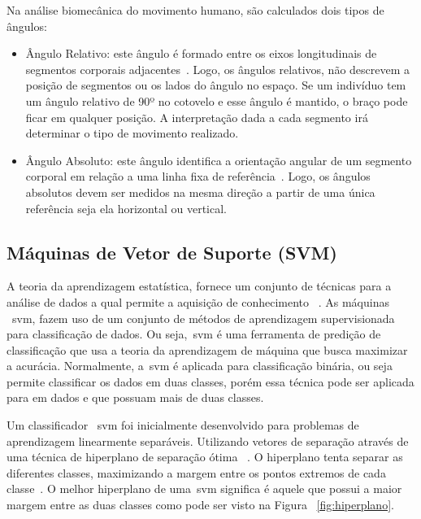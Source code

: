 Na análise biomecânica do movimento humano, são calculados dois tipos de ângulos:
	\begin{itemize}
		\item Ângulo Relativo: este ângulo é formado entre os eixos longitudinais de segmentos corporais adjacentes~\cite{hamill1999bases}. Logo, os ângulos relativos, não descrevem a posição de segmentos ou os lados do ângulo no espaço. Se um indivíduo tem um ângulo relativo de 90º no cotovelo e esse ângulo é mantido, o braço pode ficar em qualquer posição. A interpretação dada a cada segmento irá determinar o tipo de movimento realizado. 
		\item Ângulo Absoluto: este ângulo identifica a orientação angular de um segmento corporal em relação a uma linha fixa de referência~\cite{hamill1999bases}. Logo, os ângulos absolutos devem ser medidos na mesma direção a partir de uma única referência seja ela horizontal ou vertical.
	\end{itemize}



\subsection{Máquinas de Vetor de Suporte (SVM)}\label{sec:svm_linear}
A teoria da aprendizagem estatística, fornece um conjunto de técnicas para a análise de dados a qual permite a aquisição de conhecimento ~\cite{vapnik95}. As máquinas ~\ac{svm}, fazem uso de um conjunto de métodos de aprendizagem supervisionada para classificação de dados. Ou seja,~\ac{svm} é uma ferramenta de predição de classificação que usa a teoria da aprendizagem de máquina que busca maximizar a acurácia. Normalmente, a~\ac{svm} é aplicada para classificação binária, ou seja permite classificar os dados em duas classes, porém essa técnica pode ser aplicada para em dados e que possuam mais de duas classes.

Um classificador ~\ac{svm} foi inicialmente desenvolvido para problemas de aprendizagem linearmente separáveis. Utilizando vetores de separação através de uma técnica de hiperplano de separação ótima ~\cite{vapnik95}. O hiperplano tenta separar as diferentes classes, maximizando a margem entre os pontos extremos de cada classe~\cite{valt2010}. O melhor hiperplano de uma~\ac{svm} significa é aquele que possui a maior margem entre as duas classes como pode ser visto na Figura ~\ref{fig:hiperplano}.  

